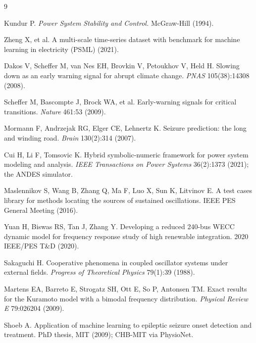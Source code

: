 \documentclass[journal]{IEEEtran}
\begin{document}
\begin{thebibliography}{9}

 Kundur P. \emph{Power System Stability and
Control.} McGraw-Hill (1994).

 Zheng X, et al. A multi-scale time-series dataset
with benchmark for machine learning in electricity (PSML) (2021).

 Dakos V, Scheffer M, van Nes EH, Brovkin V,
Petoukhov V, Held H. Slowing down as an early warning signal for abrupt
climate change. \emph{PNAS} 105(38):14308 (2008).

 Scheffer M, Bascompte J, Brock WA, et al.
Early-warning signals for critical transitions. \emph{Nature} 461:53
(2009).

 Mormann F, Andrzejak RG, Elger CE, Lehnertz K.
Seizure prediction: the long and winding road. \emph{Brain} 130(2):314
(2007).

 Cui H, Li F, Tomsovic K. Hybrid symbolic-numeric
framework for power system modeling and analysis. \emph{IEEE
Transactions on Power Systems} 36(2):1373 (2021); the ANDES simulator.

 Maslennikov S, Wang B, Zhang Q, Ma F, Luo X,
Sun K, Litvinov E. A test cases library for methods locating the
sources of sustained oscillations. IEEE PES General Meeting (2016).

 Yuan H, Biswas RS, Tan J, Zhang Y. Developing a
reduced 240-bus WECC dynamic model for frequency response study of high
renewable integration. 2020 IEEE/PES T\&D (2020).

 Sakaguchi H. Cooperative phenomena in coupled
oscillator systems under external fields. \emph{Progress of
Theoretical Physics} 79(1):39 (1988).

 Martens EA, Barreto E, Strogatz SH, Ott E, So P,
Antonsen TM. Exact results for the Kuramoto model with a bimodal
frequency distribution. \emph{Physical Review E} 79:026204 (2009).

 Shoeb A. Application of machine learning to
epileptic seizure onset detection and treatment. PhD thesis, MIT
(2009); CHB-MIT via PhysioNet.

\end{thebibliography}
\end{document}
